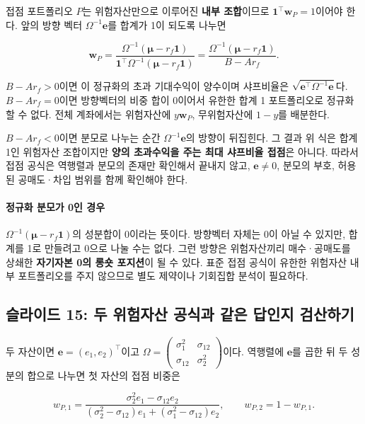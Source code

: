 \documentclass[11pt,a4paper]{article}
\begin{document}
접점 포트폴리오 $P$는 위험자산만으로 이루어진 \textbf{내부 조합}이므로 $\mathbf1^\top\mathbf w_P=1$이어야 한다. 앞의 방향 벡터 $\Omega^{-1}\mathbf e$를 합계가 1이 되도록 나누면
\par

\[
\mathbf w_P=\frac{\Omega^{-1}(\boldsymbol\mu-r_f\mathbf1)}
{\mathbf1^\top\Omega^{-1}(\boldsymbol\mu-r_f\mathbf1)}
=\frac{\Omega^{-1}(\boldsymbol\mu-r_f\mathbf1)}{B-Ar_f}.
\]

$B-Ar_f>0$이면 이 정규화의 초과 기대수익이 양수이며 샤프비율은 $\sqrt{\mathbf e^\top\Omega^{-1}\mathbf e}$다. $B-Ar_f=0$이면 방향벡터의 비중 합이 0이어서 유한한 합계 1 포트폴리오로 정규화할 수 없다. 전체 계좌에서는 위험자산에 $y\mathbf w_P$, 무위험자산에 $1-y$를 배분한다.
\par

$B-Ar_f<0$이면 분모로 나누는 순간 $\Omega^{-1}\mathbf e$의 방향이 뒤집힌다. 그 결과 위 식은 합계 1인 위험자산 조합이지만 \textbf{양의 초과수익을 주는 최대 샤프비율 접점}은 아니다. 따라서 접점 공식은 역행렬과 분모의 존재만 확인해서 끝내지 않고, $\mathbf e\ne0$, 분모의 부호, 허용된 공매도·차입 범위를 함께 확인해야 한다.
\par

\paragraph{정규화 분모가 0인 경우}

$\Omega^{-1}(\boldsymbol\mu-r_f\mathbf1)$의 성분합이 0이라는 뜻이다. 방향벡터 자체는 0이 아닐 수 있지만, 합계를 1로 만들려고 0으로 나눌 수는 없다. 그런 방향은 위험자산끼리 매수·공매도를 상쇄한 \textbf{자기자본 0의 롱숏 포지션}이 될 수 있다. 표준 접점 공식이 유한한 위험자산 내부 포트폴리오를 주지 않으므로 별도 제약이나 기회집합 분석이 필요하다.
\par

\subsection{슬라이드 15: 두 위험자산 공식과 같은 답인지 검산하기}

두 자산이면 $\mathbf e=(e_1,e_2)^\top$이고 $\Omega=\begin{pmatrix}\sigma_1^2&\sigma_{12}\\\sigma_{12}&\sigma_2^2\end{pmatrix}$이다. 역행렬에 $\mathbf e$를 곱한 뒤 두 성분의 합으로 나누면 첫 자산의 접점 비중은
\par

\[
w_{P,1}=\frac{\sigma_2^2e_1-\sigma_{12}e_2}
{(\sigma_2^2-\sigma_{12})e_1+(\sigma_1^2-\sigma_{12})e_2},
\qquad w_{P,2}=1-w_{P,1}.
\]
\end{document}
